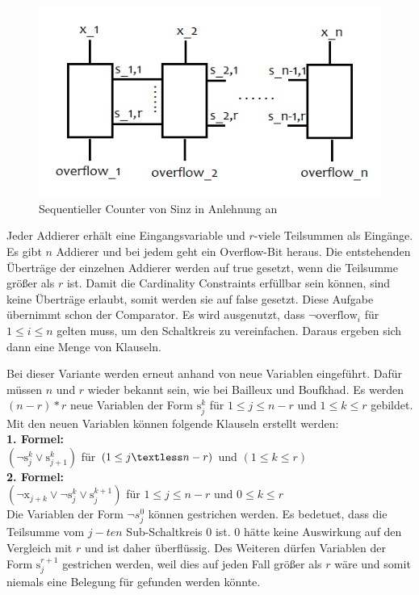\documentclass[a4,abstract=on]{scrartcl}
\begin{document}
\begin{figure}[H]
\centering
\includegraphics[width=\textwidth]{Sinz_seq.png}
\caption{Sequentieller Counter von Sinz in Anlehnung an \cite[][] {sinz}}
\label{fig:sinz_counter}
\end{figure}

Jeder Addierer erhält eine Eingangsvariable und $r$-viele Teilsummen als Eingänge. Es gibt $n$ Addierer und bei jedem geht ein Overflow-Bit heraus. Die entstehenden Überträge der einzelnen Addierer werden auf true gesetzt, wenn die Teilsumme größer als $r$ ist. Damit die Cardinality Constraints erfüllbar sein können, sind keine Überträge erlaubt, somit werden sie auf false gesetzt. Diese Aufgabe übernimmt schon der Comparator. Es wird ausgenutzt, dass $\neg \text{overflow}_i$ für $1 \leq i \leq n$ gelten muss, um den Schaltkreis zu vereinfachen. Daraus ergeben sich dann eine Menge von Klauseln.

Bei dieser Variante werden erneut anhand von \cite[][]{knuth} neue Variablen eingeführt. Dafür müssen $n$ und $r$ wieder bekannt sein, wie bei Bailleux und Boufkhad. Es werden $(n-r)*r$ neue Variablen der Form $\text{s}_j^k$ für $1 \leq j \leq n - r$ und $1 \leq k \leq r$ gebildet. \\
Mit den neuen Variablen können folgende Klauseln erstellt werden:\\
\textbf{1. Formel:}\\
$(\neg \text{s}_j^k \vee \text{s}_{j+1}^k)$ für $(1 \leq j \textless n - r)$ und $(1 \leq k \leq r)$\\
\textbf{2. Formel:}\\
$(\neg \text{x}_{j+k} \vee \neg \text{s}_j^k \vee \text{s}_j^{k+1})$ für $1 \leq j \leq n - r$ und $0 \leq k \leq r$\\

Die Variablen der Form  $\neg s_j^0$ können gestrichen werden. Es bedetuet, dass die Teilsumme vom $j-ten$ Sub-Schaltkreis  $0$ ist. $0$ hätte keine Auswirkung auf den Vergleich mit $r$ und ist daher überflüssig. Des Weiteren dürfen Variablen der Form $\text{s}_j^{r+1}$ gestrichen werden, weil dies auf jeden Fall größer als $r$ wäre und somit niemals eine Belegung für gefunden werden könnte.
\end{document}

